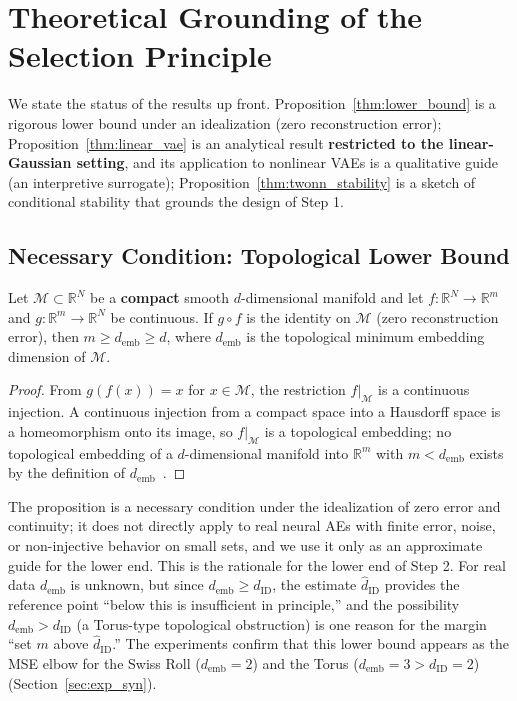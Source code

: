 \documentclass[make,article,submit,pdftex,moreauthors]{Definitions/mdpi}
\newcommand{\dID}{d_{\mathrm{ID}}}
\newcommand{\hatdID}{\hat{d}_{\mathrm{ID}}}
\newcommand{\R}{\mathbb{R}}
\newcommand{\demb}{d_{\mathrm{emb}}}
\begin{document}
\section{Theoretical Grounding of the Selection Principle}\label{sec:theory}

We state the status of the results up front.
Proposition~\ref{thm:lower_bound} is a rigorous lower bound under an
idealization (zero reconstruction error);
Proposition~\ref{thm:linear_vae} is an analytical result
\textbf{restricted to the linear-Gaussian setting}, and its application to
nonlinear VAEs is a qualitative guide (an interpretive surrogate);
Proposition~\ref{thm:twonn_stability} is a sketch of conditional stability
that grounds the design of Step 1.

\subsection{Necessary Condition: Topological Lower Bound}\label{sec:theory_lower}

\begin{Proposition}\label{thm:lower_bound}
Let $\mathcal{M} \subset \R^N$ be a \textbf{compact} smooth $d$-dimensional
manifold and let $f: \R^N \to \R^m$ and $g: \R^m \to \R^N$ be continuous.
If $g \circ f$ is the identity on $\mathcal{M}$ (zero reconstruction
error), then $m \geq \demb \geq d$, where $\demb$ is the topological
minimum embedding dimension of $\mathcal{M}$.
\end{Proposition}

\begin{proof}
From $g(f(x)) = x$ for $x \in \mathcal{M}$, the restriction
$f|_\mathcal{M}$ is a continuous injection.
A continuous injection from a compact space into a Hausdorff space is a
homeomorphism onto its image, so $f|_\mathcal{M}$ is a topological
embedding; no topological embedding of a $d$-dimensional manifold into
$\R^m$ with $m < \demb$ exists by the definition of
$\demb$~\cite{hatcher2002algebraic}.
\end{proof}

The proposition is a necessary condition under the idealization of zero
error and continuity; it does not directly apply to real neural AEs with
finite error, noise, or non-injective behavior on small sets, and we use it
only as an approximate guide for the lower end.
This is the rationale for the lower end of Step 2.
For real data $\demb$ is unknown, but since $\demb \geq \dID$, the estimate
$\hatdID$ provides the reference point ``below this is insufficient in
principle,'' and the possibility $\demb > \dID$ (a Torus-type topological
obstruction) is one reason for the margin ``set $m$ above $\hatdID$.''
The experiments confirm that this lower bound appears as the MSE elbow for
the Swiss Roll ($\demb = 2$) and the Torus ($\demb = 3 > \dID = 2$)
(Section~\ref{sec:exp_syn}).
\end{document}
